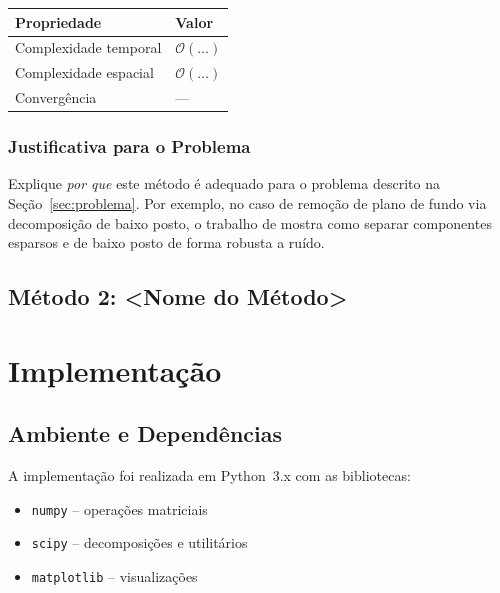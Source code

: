 \documentclass[12pt, a4paper]{article}
\begin{document}
\begin{tabular}{ll}
  \toprule
  Propriedade        & Valor \\
  \midrule
  Complexidade temporal & $\mathcal{O}(\ldots)$ \\
  Complexidade espacial & $\mathcal{O}(\ldots)$ \\
  Convergência          & --- \\
  \bottomrule
\end{tabular}

\subsubsection{Justificativa para o Problema}

Explique \emph{por que} este método é adequado para o problema descrito
na Seção~\ref{sec:problema}. Por exemplo, no caso de remoção de plano de
fundo via decomposição de baixo posto, o trabalho de
\textcite{candes2011robust} mostra como separar componentes esparsos e
de baixo posto de forma robusta a ruído.


\subsection{Método 2: <Nome do Método>} %


\newpage

\section{Implementação}
\label{sec:implementacao}


\subsection{Ambiente e Dependências}

A implementação foi realizada em Python~3.x com as bibliotecas:

\begin{itemize}
  \item \texttt{numpy} – operações matriciais
  \item \texttt{scipy} – decomposições e utilitários
  \item \texttt{matplotlib} – visualizações
\end{itemize}
\end{document}
